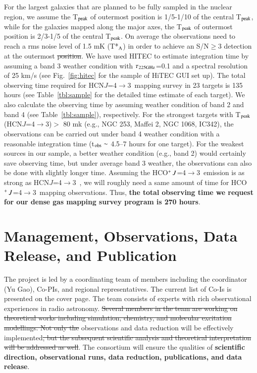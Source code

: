 \documentclass[legal,11pt]{article}
\def\,{\thinspace}
\def\HCNft        {HCN\,$J$=4$\rightarrow$3}
\def\HCOPft     {HCO$^+\,J$=4$\rightarrow$3}
\providecommand{\DIFaddtex}[1]{{\protect\color{blue}\uwave{#1}}} %
\providecommand{\DIFdeltex}[1]{{\protect\color{red}\sout{#1}}}                      %
\providecommand{\DIFaddbegin}{} %
\providecommand{\DIFaddend}{} %
\providecommand{\DIFdelbegin}{} %
\providecommand{\DIFdelend}{} %
\providecommand{\DIFadd}[1]{\texorpdfstring{\DIFaddtex{#1}}{#1}} %
\providecommand{\DIFdel}[1]{\texorpdfstring{\DIFdeltex{#1}}{}} %
\begin{document}
For the largest galaxies that are planned to be fully sampled in the nuclear
region, we assume the T$_{\rm peak}$ of outermost position is 1/5-1/10 of the
central T$_{\rm peak}$, while for the galaxies mapped along the major axes, the
T$_{\rm peak}$ of outermost position is 2/3-1/5 of the central T$_{\rm peak}$\DIFaddbegin \DIFadd{,
with two or three pointing per galaxy}\DIFaddend .  On average the observations need to
reach a rms noise level of 1.5 mK (T*$_{\rm A}$) in order to achieve an
S/N$\geq$3 detection at the outermost \DIFdelbegin \DIFdel{position}\DIFdelend \DIFaddbegin \DIFadd{positions}\DIFaddend . We have used HITEC to estimate
integration time by assuming a band 3 weather condition with $\tau_{\rm
225GHz}$=0.1 and a spectral resolution of 25 km/s (see Fig.~\ref{fig:hitec} for
the sample of HiTEC GUI set up). The total observing time required for \HCNft\
mapping survey in 23 targets is 135 hours (see Table~\ref{tbl:sample} for the
detailed time estimate of each target).  We also calculate the observing time
by assuming weather condition of band 2 and band 4 (see
Table~\ref{tbl:sample}), respectively. For the strongest targets with T$_{\rm
peak}$(\HCNft)$>$ 80 mk (e.g., NGC 253, Maffei 2, NGC 1068, IC342),  the
observations can be carried out under band 4 weather condition with a
reasonable integration time (t$_{\rm obs}\sim$ 4.5--7 hours for one target).
For the weakest sources in our sample, a better weather condition (e.g., band
2) would certainly save observing time, but under average band 3 weather, the
observations can also be done with slightly longer time.  Assuming the \HCOPft\
emission is as strong as \HCNft\ \citep[see][]{zgh2014}, we will roughly need a
same amount of time for \HCOPft\ mapping observations.  Thus, {\bf the total
observing time we request for our dense gas mapping survey program is
270 hours}.



\section{Management, Observations, Data Release, and Publication } 


The project is led by a coordinating team of members including the coordinator
(Yu Gao), Co-PIs, and regional representatives. The current list of Co-Is is
presented on the cover page. The team consists of experts with rich
observational experiences in radio astronomy.  \DIFdelbegin \DIFdel{Several members in the team are
working on theoretical works including simulation, chemistry, and molecular
excitation modellings. Not only the }\DIFdelend \DIFaddbegin \DIFadd{The }\DIFaddend observations and data
reduction will be effectively implemented\DIFdelbegin \DIFdel{, but the subsequent scientific analysis and theoretical
interpretation will be addressed as well}\DIFdelend .  The consortium will ensure the
qualities of {\bf scientific direction, observational runs, data reduction,
publications, and data release}. 
\end{document}
